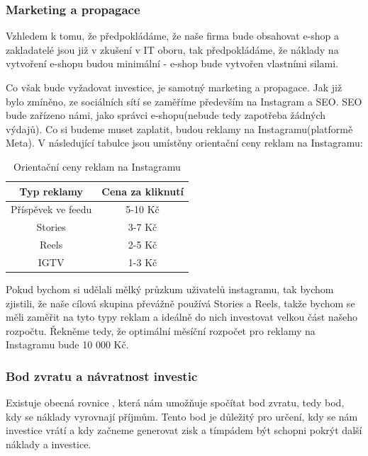 \documentclass[12pt, a4paper]{article}
\begin{document}
\subsubsection{Marketing a propagace}

Vzhledem k tomu, že předpokládáme, že naše firma bude obsahovat e-shop a
zakladatelé jsou již v zkušení v IT oboru, tak
předpokládáme, že náklady na vytvoření e-shopu budou minimální - e-shop
bude vytvořen vlastními silami.

\vspace{10pt}
\noindent Co však bude vyžadovat investice, je samotný marketing a propagace.
Jak již bylo zmíněno, ze sociálních sítí se zaměříme především na Instagram a SEO.
SEO bude zařízeno námi, jako správci e-shopu(nebude tedy zapotřeba žádných výdajů). Co si budeme
muset zaplatit, budou reklamy na Instagramu(platformě Meta).
V následující tabulce jsou umístěny orientační ceny reklam na Instagramu:

\begin{table}[h]
  \centering
  \begin{tabular}{ |c|c| }
    \hline
    \textbf{Typ reklamy} & \textbf{Cena za kliknutí} \\
    \hline
    \hline
    Příspěvek ve feedu & 5-10 Kč \\
    \hline
    Stories & 3-7 Kč \\
    \hline
    Reels & 2-5 Kč \\
    \hline
    IGTV & 1-3 Kč \\
    \hline
  \end{tabular}
  \caption{Orientační ceny reklam na Instagramu \cite{reklamy-ig-zoomstudio}}
\end{table}

\noindent Pokud bychom si udělali mělký průzkum uživatelů instagramu, tak bychom zjistili, že
naše cílová skupina převážně používá Stories a Reels, takže bychom se měli zaměřit na tyto typy reklam
a ideálně do nich investovat velkou část našeho rozpočtu. Řekněme tedy, že optimální měsíční
rozpočet pro reklamy na Instagramu bude 10 000 Kč.

\subsubsection{Bod zvratu a návratnost investic}

Existuje obecná rovnice \cite{bod-zvratu}, která nám umožňuje spočítat bod zvratu, tedy bod, kdy se náklady vyrovnají příjmům.
Tento bod je důležitý pro určení, kdy se nám investice vrátí a kdy začneme generovat zisk a tímpádem
být schopni pokrýt další náklady a investice.
\end{document}
